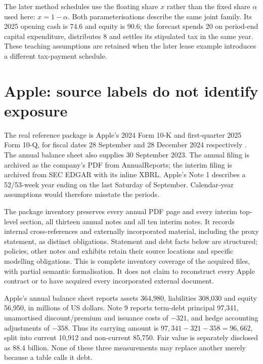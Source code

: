 The later method schedules use the floating share $x$ rather than the fixed
share $\alpha$ used here: $x=1-\alpha$. Both parameterisations describe the
same joint family. Its 2025 opening cash is 74.6 and equity is 90.6; the
forecast spends 20 on period-end capital expenditure, distributes 8 and settles
its stipulated tax in the same year. These teaching assumptions are retained
when the later lease example introduces a different tax-payment schedule.





\section{Apple: source labels do not identify exposure}
\label{sec:apple}

The real reference package is Apple's 2024 Form 10-K and first-quarter 2025
Form 10-Q, for fiscal dates 28 September and 28 December 2024 respectively
\citep{apple2024,apple2025q1}. The annual balance sheet also supplies
30 September 2023. The annual filing is archived as the company's PDF from
AnnualReports; the interim filing is archived from SEC EDGAR with its inline
XBRL. Apple's Note 1 describes a 52/53-week year ending on the last Saturday
of September. Calendar-year assumptions would therefore misstate the periods.

The package inventory preserves every annual PDF page and every interim
top-level section, all thirteen annual notes and all ten interim notes.
It records internal cross-references and externally incorporated material,
including the proxy statement, as distinct obligations. Statement and debt
facts below are structured; policies, other notes and exhibits retain their
source locations and specific modelling obligations. This is complete
inventory coverage of the acquired files, with partial semantic formalisation.
It does not claim to reconstruct every Apple contract or to have acquired
every incorporated external document.

Apple's annual balance sheet reports assets 364,980, liabilities 308,030 and
equity 56,950, in millions of US dollars. Note 9 reports term-debt principal
97,341, unamortised discount/premium and issuance costs of $-321$, and hedge
accounting adjustments of $-358$. Thus its carrying amount is
$97{,}341-321-358=96{,}662$, split into current 10,912 and non-current
85,750. Fair value is separately disclosed as 88.4 billion. None of these
three measurements may replace another merely because a table calls it debt.

